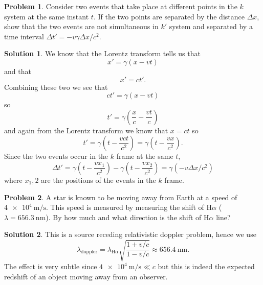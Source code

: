 \documentclass[10pt]{article}
\theoremstyle{definition}
\newtheorem{problem}{Problem}
\newtheorem{soln}{Solution}
\begin{document}
\begin{problem}
Consider two events that take place at different points in the $k$ system at the same instant $t$. If the
two points are separated by the distance $\Delta x$, show that the two events are not simultaneous in $k'$
system and separated by a time interval $\Delta t'=-v\gamma\Delta x/c^2$.
\end{problem}
\begin{soln}
  We know that the Lorentz transform tells us that
  $$x'=\gamma(x-vt)$$
  and that
  $$x'=ct'.$$
  Combining these two we see that
  $$ct'=\gamma(x-vt)$$
  so
  $$t'=\gamma(\frac{x}{c}-\frac{vt}{c})$$
  and again from the Lorentz transform we know that $x=ct$ so
  $$t'=\gamma(t-\frac{vct}{c^2})=\gamma(t-\frac{vx}{c^2}).$$
  Since the two events occur in the $k$ frame at the same $t$,
  $$\Delta t'=\gamma(t-\frac{vx_{1}}{c^2})-\gamma(t-\frac{vx_{2}}{c^2})=\gamma (-v\Delta x/c^2)$$
  where $x_1,2$ are the positions of the events in the $k$ frame.
\end{soln}

\begin{problem}
A star is known to be moving away from Earth at a speed of $\qty{4e4}{\meter\per\second}$. This speed is measured
by measuring the shift of H$\alpha$ ($\lambda=\qty{656.3}{\nano\meter}$). By how much and what direction is the shift of H$\alpha$
line?
\end{problem}
\begin{soln}
  This is a source receding relativistic doppler problem, hence we use
  $$\lambda_{\mathrm{doppler}}=\lambda_{\mathrm{H}\alpha}\sqrt{\frac{1+v/c}{1-v/c}}\approx \qty{656.4}{\nano\meter}.$$
  The effect is very subtle since $\qty{4e4}{\meter\per\second}\ll c$ but this is indeed the expected redshift of an object moving away
  from an observer.
\end{soln}
\end{document}
